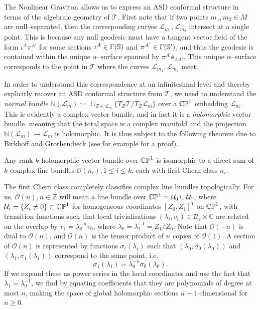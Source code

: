 The Nonlinear Graviton allows us to express an ASD conformal structure in terms of the algebraic geometry of $\mathscr{T}$. First note that if two points $m_1,m_2\in M$ are null--separated, then the corresponding curves $\mathscr{L}_{m_1},\mathscr{L}_{m_2}$ intersect at a single point. This is because any null geodesic must have a tangent vector field of the form $\iota^A\pi^{A'}$ for some sections $\iota^A\in\Gamma(\mathbb{S})$ and $\pi^{A'}\in\Gamma(\mathbb{S}')$, and thus the geodesic is contained within the unique $\alpha$--surface spanned by $\pi^{A'}\mathsf{e}_{AA'}$. This unique $\alpha$--surface corresponds to the point in $\mathscr{T}$ where the curves $\mathscr{L}_{m_1},\mathscr{L}_{m_2}$ meet.

In order to understand this correspondence at an infinitesimal level and thereby explicitly recover an ASD conformal structure from $\mathscr{T}$, we need to understand the \textit{normal bundle} $\mathbb{N}(\mathscr{L}_m):=\cup_{Z\in \mathscr{L}_m}\{T_Z\mathscr{T}/T_Z\mathscr{L}_m\}$ over a $\mathbb{CP}^1$ embedding $\mathscr{L}_m$. This is evidently a complex vector bundle, and in fact it is a \textit{holomorphic} vector bundle, meaning that the total space is a complex manifold and the projection $\mathbb{N}(\mathscr{L}_m)\rightarrow\mathscr{L}_m$ is holomorphic. It is thus subject to the following theorem due to Birkhoff and Grothendieck (see for example \cite{complex_mfds} for a proof).
\begin{theo}
Any rank $k$ holomorphic vector bundle over $\mathbb{CP}^1$ is isomorphic to a direct sum of $k$ complex line bundles $\mathcal{O}(n_i),1\leq i\leq k$, each with first Chern class $n_i$. 
\end{theo}

The first Chern class completely classifies complex line bundles topologically. For us, $\mathcal{O}(n),n\in\mathbb{Z}$ will mean a line bundle over $\mathbb{CP}^1=\mathcal{U}_0\cup\mathcal{U}_1$, where $\mathcal{U}_i=\{Z_i\neq 0\}\subset\mathbb{CP}^1$ for homogeneous coordinates $[Z_0,Z_1]^T$ on $\mathbb{CP}^1$, with transition functions such that local trivialisations $(\lambda_i,v_i)\in\mathcal{U}_i\times\mathbb{C}$ are related on the overlap by $v_1=\lambda_0^{-n}v_0$, where $\lambda_0=\lambda_1^{-1}=Z_1/Z_0$. Note that $\mathcal{O}(-n)$ is dual to $\mathcal{O}(n)$, and $\mathcal{O}(n)$ is the tensor product of $n$ copies of $\mathcal{O}(1)$. A section of $\mathcal{O}(n)$ is represented by functions $\sigma_i(\lambda_i)$ such that $(\lambda_0,\sigma_0(\lambda_0))$ and $(\lambda_1,\sigma_1(\lambda_1))$ correspond to the same point, i.e.
\[
\sigma_1(\lambda_1)=\lambda_0^{-n}\sigma_0(\lambda_0).
\]
If we expand these as power series in the local coordinates and use the fact that ${\lambda}_1=\lambda_0^{-1}$, we find by equating coefficients that they are polynomials of degree at most $n$, making the space of global holomorphic sections $n+1$--dimensional for $n\geq 0$.

